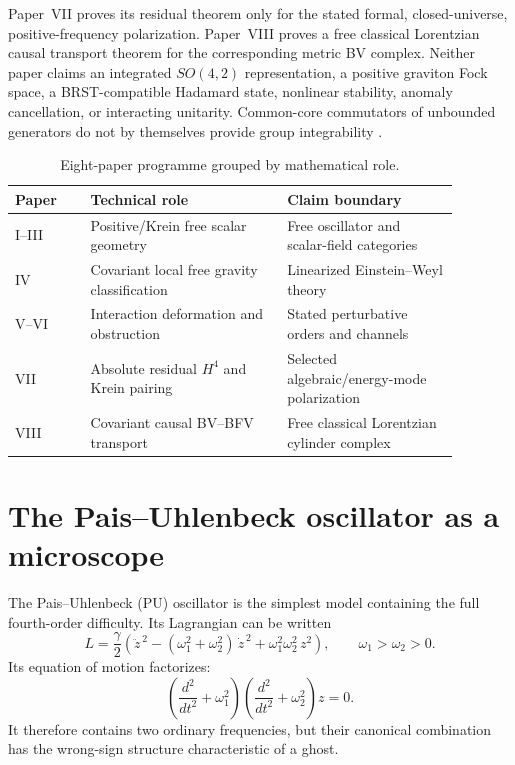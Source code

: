\documentclass[11pt]{article}
\theoremstyle{remark}
\newcommand{\w}{\omega}
\begin{document}
Paper~VII proves its residual theorem only for the stated formal,
closed-universe, positive-frequency polarization.  Paper~VIII proves a free
classical Lorentzian causal transport theorem for the corresponding metric
BV complex.  Neither paper claims an integrated $SO(4,2)$ representation, a
positive graviton Fock space, a BRST-compatible Hadamard state, nonlinear
stability, anomaly cancellation, or interacting unitarity.  Common-core
commutators of unbounded generators do not by themselves provide group
integrability \cite{JorgensenTianIntro}.

\begin{table}[p]
\centering\scriptsize
\begin{tabular}{>{\raggedright\arraybackslash}p{0.15\linewidth}
                >{\raggedright\arraybackslash}p{0.39\linewidth}
                >{\raggedright\arraybackslash}p{0.34\linewidth}}
\toprule
Paper & Technical role & Claim boundary\\
\midrule
I--III & Positive/Krein free scalar geometry & Free oscillator and scalar-field categories\\
IV & Covariant local free gravity classification & Linearized Einstein--Weyl theory\\
V--VI & Interaction deformation and obstruction & Stated perturbative orders and channels\\
VII & Absolute residual $H^4$ and Krein pairing & Selected algebraic/energy-mode polarization\\
VIII & Covariant causal BV--BFV transport & Free classical Lorentzian cylinder complex\\
\bottomrule
\end{tabular}
\caption{Eight-paper programme grouped by mathematical role.}
\label{tab:programme-status}
\end{table}

\section{The Pais--Uhlenbeck oscillator as a microscope}\label{sec:pu}

The Pais--Uhlenbeck (PU) oscillator \cite{PU1950} is the simplest model
containing the full fourth-order difficulty.  Its Lagrangian can be
written
\begin{equation}
L=\frac{\gamma}{2}
\left(\ddot z^{\,2}-(\w_1^2+\w_2^2)\,\dot z^{\,2}
+\w_1^2\w_2^2\,z^2\right),
\qquad \w_1>\w_2>0 .
\end{equation}
Its equation of motion factorizes:
\begin{equation}
\left(\frac{d^2}{dt^2}+\w_1^2\right)
\left(\frac{d^2}{dt^2}+\w_2^2\right)z=0 .
\end{equation}
It therefore contains two ordinary frequencies, but their canonical
combination has the wrong-sign structure characteristic of a ghost.
\end{document}
